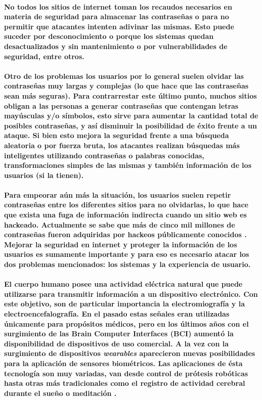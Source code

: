 \documentclass{article}
\begin{document}
\paragraph{
 No todos los sitios de internet toman los recaudos necesarios en materia de seguridad para almacenar las contraseñas o para no permitir que atacantes intenten adivinar las mismas. Esto puede suceder por desconocimiento o porque los sistemas quedan desactualizados y sin mantenimiento o por vulnerabilidades de seguridad, entre otros.
}
\paragraph{
Otro de los problemas los usuarios por lo general suelen olvidar las contraseñas muy largas y complejas (lo que hace que las contraseñas sean más seguras). Para contrarrestar este último punto, muchos sitios obligan a las personas a generar contraseñas que contengan letras mayúsculas y/o símbolos, esto sirve para aumentar la cantidad total de posibles contraseñas, y así disminuir la posibilidad de éxito frente a un ataque. Si bien esto mejora la seguridad frente a una búsqueda aleatoria o por fuerza bruta, los atacantes realizan búsquedas más inteligentes utilizando contraseñas o palabras conocidas, transformaciones simples de las mismas y también información de los usuarios (si la tienen).
}
\paragraph{
Para empeorar aún más la situación, los usuarios suelen repetir contraseñas entre los diferentes sitios para no olvidarlas, lo que hace que exista una fuga de información indirecta cuando un sitio web es hackeado. Actualmente se sabe que más de cinco mil millones de contraseñas fueron adquiridas por hackeos públicamente conocidos \cite{haveibeenpwned}. Mejorar la seguridad en internet y proteger la información de los usuarios es sumamente importante y para eso es necesario atacar los dos problemas mencionados: los sistemas y la experiencia de usuario.
}
\paragraph{
El cuerpo humano posee una actividad eléctrica natural que puede utilizarse para transmitir información a un dispositivo electrónico. Con este objetivo, son de particular importancia la electromiografía y la electroencefalografía. En el pasado estas señales eran utilizadas únicamente para propósitos médicos, pero en los últimos años con el surgimiento de las Brain Computer Interfaces (BCI) aumentó la disponibilidad de dispositivos de uso comercial. A la vez con la surgimiento de dispositivos \textit{wearables} aparecieron nuevas posibilidades para la aplicación de sensores biométricos. Las aplicaciones de ésta tecnología son muy variadas, van desde control de prótesis robóticas \cite{veer2015} hasta otras más tradicionales como el registro de actividad cerebral durante el sueño o meditación \cite{kaur2015}.
}
\end{document}
